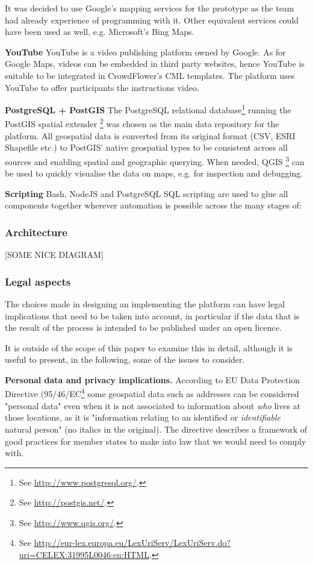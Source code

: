 It was decided to use Google's mapping services for the prototype as the team had already experience of programming with it. Other equivalent services could have been used as well, e.g. Microsoft's Bing Maps.

\textbf{YouTube} YouTube is a video publishing platform owned by Google. As for Google Maps, videos can be embedded in third party websites, hence YouTube is suitable to be integrated in CrowdFlower's CML templates. The platform uses YouTube to offer participants the instructions video.  

\textbf{PostgreSQL + PostGIS} The PostgreSQL relational database\footnote{See \url{http://www.postgresql.org/}.} running the PostGIS spatial extender \footnote{See \url{http://postgis.net/}.} was chosen as the main data repository for the platform. All geospatial data is converted from its original format (CSV, ESRI Shapefile etc.) to PostGIS' native geospatial types to be consistent across all sources and enabling spatial and geographic querying. When needed, QGIS \footnote{See \url{http://www.qgis.org/}.} can be used to quickly visualise the data on maps, e.g. for inspection and debugging.

\textbf{Scripting} Bash, NodeJS and PostgreSQL SQL scripting are used to glue all components together wherever automation is possible across the many stages of:  

\subsubsection{Architecture}

[SOME NICE DIAGRAM]

\subsubsection{Legal aspects}

The choices made in designing an implementing the platform can have legal implications that need to be taken into account, in particular if the data that is the result of the process is intended to be published under an open licence.

It is outside of the scope of this paper to examine this in detail, although it is useful to present, in the following, some of the issues to consider.

\textbf{Personal data and privacy implications.} According to EU Data Protection Directive (95/46/EC\footnote{See \url{http://eur-lex.europa.eu/LexUriServ/LexUriServ.do?uri=CELEX:31995L0046:en:HTML}.} some geospatial data such as addresses can be considered "personal data" even when it is not associated to information about {\it who} lives at those locations, as it is "information relating to an identified or {\it identifiable} natural person" (no italics in the original). The directive describes a framework of good practices for member states to make into law that we would need to comply with.
	

